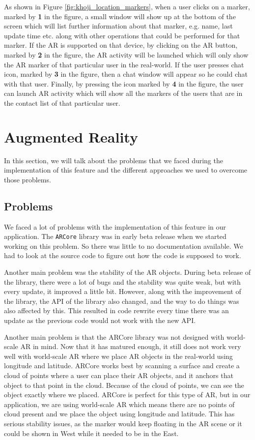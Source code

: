 As shown in Figure \ref{fig:khoji_location_markers}, when a user clicks on a marker, marked by \textbf{1} in the figure, a small window will show up at the bottom of the screen which will list further information about that marker, e.g. name, last update time etc. along with other operations that could be performed for that marker. If the AR is supported on that device, by clicking on the AR button, marked by \textbf{2} in the figure, the AR activity will be launched which will only show the AR marker of that particular user in the real-world. If the user presses chat icon, marked by \textbf{3} in the figure, then a chat window will appear so he could chat with that user. Finally, by pressing the icon marked by \textbf{4} in the figure, the user can launch AR activity which will show all the markers of the users that are in the contact list of that particular user.




\section{Augmented Reality}
In this section, we will talk about the problems that we faced during the implementation of this feature and the different approaches we used to overcome those problems.
\subsection{Problems}
We faced a lot of problems with the implementation of this feature in our application. The \texttt{ARCore} library was in early beta release when we started working on this problem. So there was little to no documentation available. We had to look at the source code to figure out how the code is supposed to work.

Another main problem was the stability of the AR objects. During beta release of the library, there were a lot of bugs and the stability was quite weak, but with every update, it improved a little bit. However, along with the improvement of the library, the API of the library also changed, and the way to do things was also affected by this. This resulted in code rewrite every time there was an update as the previous code would not work with the new API.

Another main problem is that the ARCore library was not designed with world-scale AR in mind. Now that it has matured enough, it still does not work very well with world-scale AR where we place AR objects in the real-world using longitude and latitude. ARCore works best by scanning a surface and create a cloud of points where a user can place their AR objects, and it anchors that object to that point in the cloud. Because of the cloud of points, we can see the object exactly where we placed. ARCore is perfect for this type of AR, but in our application, we are using world-scale AR which means there are no points of cloud present and we place the object using longitude and latitude. This has serious stability issues, as the marker would keep floating in the AR scene or it could be shown in West while it needed to be in the East.

